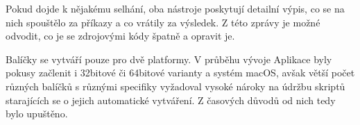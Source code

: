 Pokud dojde k nějakému selhání, oba nástroje poskytují detailní výpis, co se na nich spouštělo za příkazy a co vrátily za výsledek. Z této zprávy je možné odvodit, co je se zdrojovými kódy špatně a opravit je.

Balíčky se vytváří pouze pro dvě platformy. V průběhu vývoje Aplikace byly pokusy začlenit i 32bitové či 64bitové varianty a systém macOS, avšak větší počet různých balíčků s různými specifiky vyžadoval vysoké nároky na údržbu skriptů starajících se o jejich automatické vytváření. Z časových důvodů od nich tedy bylo upuštěno.
